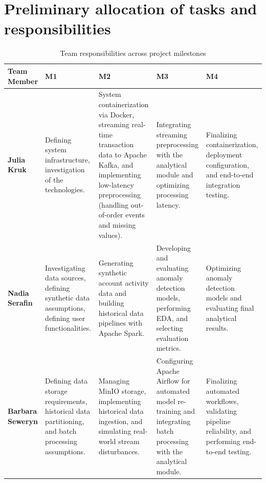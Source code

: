 \documentclass[titlepage]{article}
\begin{document}
\section{Preliminary allocation of tasks and responsibilities}

\renewcommand{\arraystretch}{1.4}
\setlength{\tabcolsep}{5pt}

\begin{table}[H]
\centering
\caption{Team responsibilities across project milestones}
\label{tab:team_responsibilities}

\footnotesize

\begin{tabularx}{\linewidth}{|>{\RaggedRight\arraybackslash}p{2cm}|*{4}{>{\RaggedRight\arraybackslash}X|}}
\toprule

\textbf{\mbox{Team} \mbox{Member}}
    & \textbf{M1} & \textbf{M2} & \textbf{M3} & \textbf{M4} \\
    \toprule

    \textbf{Julia Kruk}
    & Defining system infrastructure, investigation of the technologies.
    & System containerization via Docker, streaming real-time transaction data to Apache Kafka, and implementing low-latency preprocessing (handling out-of-order events and missing values).
    & Integrating streaming preprocessing with the analytical module and optimizing processing latency.
    & Finalizing containerization, deployment configuration, and end-to-end integration testing. \\
    \midrule

    \textbf{\mbox{Nadia} \mbox{Serafin}}
    & Investigating data sources, defining synthetic data assumptions, defining user functionalities.
    & Generating synthetic account activity data and building historical data pipelines with Apache Spark.
    & Developing and evaluating anomaly detection models, performing EDA, and selecting evaluation metrics.
    & Optimizing anomaly detection models and evaluating final analytical results. \\
    \midrule

    \textbf{Barbara Seweryn}
    & Defining data storage requirements, historical data partitioning, and batch processing assumptions.
    & Managing MinIO storage, implementing historical data ingestion, and simulating real-world stream disturbances.
    & Configuring Apache Airflow for automated model re-training and integrating batch processing with the analytical module.
    & Finalizing automated workflows, validating pipeline reliability, and performing end-to-end testing. \\
    \midrule


\end{tabularx}
\end{table}
\end{document}
